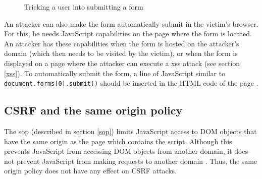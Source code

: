 \begin{figure}[htb]
	\centering
	\caption[Tricking a user into submitting a form]{Tricking a user into submitting a form \cite{Mao2009}}
	\label{fig:mao2009}
\end{figure}

An attacker can also make the form automatically submit in the victim's browser. For this, he needs JavaScript capabilities on the page where the form is located. An attacker has these capabilities when the form is hosted on the attacker's domain (which then needs to be visited by the victim), or when the form is displayed on a page where the attacker can execute a \gls{xss} attack (see section \ref{xss}). To automatically submit the form, a line of JavaScript similar to \texttt{document.forms[0].submit()} should be inserted in the HTML code of the page \cite{Jovanovic2006}.

\subsection{CSRF and the same origin policy}

The \gls{sop} (described in section \ref{sop}) limits JavaScript access to DOM objects that have the same origin as the page which contains the script. Although this prevents JavaScript from accessing DOM objects from another domain, it does not prevent JavaScript from making requests to another domain \cite{DeRyck2010}. Thus, the same origin policy does not have any effect on CSRF attacks.

